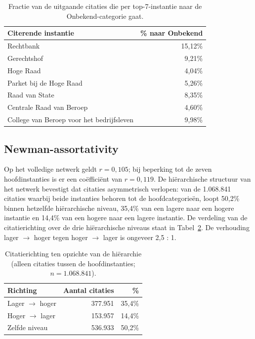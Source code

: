 \documentclass[a4paper, 12pt]{report}
\begin{document}
\begin{table}[H]
  \centering
  \caption{Fractie van de uitgaande citaties die per top-7-instantie naar de Onbekend-categorie gaat.}
  \label{tab:dv5-onbekend}
  \begin{tabular}{lr}
    \toprule
    Citerende instantie & \% naar Onbekend \\
    \midrule
    Rechtbank                                  & 15,12\% \\
    Gerechtshof                                & 9,21\% \\
    Hoge Raad                                  & 4,04\% \\
    Parket bij de Hoge Raad                    & 5,26\% \\
    Raad van State                             & 8,35\% \\
    Centrale Raad van Beroep                   & 4,60\% \\
    College van Beroep voor het bedrijfsleven  & 9,98\% \\
    \bottomrule
  \end{tabular}
\end{table}

\subsection{Newman-assortativity} 
Op het volledige netwerk geldt $r = 0{,}105$; bij beperking tot de zeven hoofdinstanties is er een coëfficiënt van $r = 0{,}119$. De hiërarchische structuur van het netwerk bevestigt dat citaties asymmetrisch verlopen: van de 1.068.841 citaties waarbij beide instanties behoren tot de hoofdcategorieën, loopt 50,2\% binnen hetzelfde hiërarchische niveau, 35,4\% van een lagere naar een hogere instantie en 14,4\% van een hogere naar een lagere instantie. De verdeling van de citatierichting over de drie hiërarchische niveaus staat in Tabel~\ref{tab:dv5-hierarchie}. De verhouding lager $\rightarrow$ hoger tegen hoger $\rightarrow$ lager is ongeveer 2,5 : 1.

\begin{table}[H]
  \centering
  \caption{Citatierichting ten opzichte van de hiërarchie (alleen citaties tussen de hoofdinstanties; $n = 1.068.841$).}
  \label{tab:dv5-hierarchie}
  \begin{tabular}{lrr}
    \toprule
    Richting & Aantal citaties & \% \\
    \midrule
    Lager $\rightarrow$ hoger & 377.951 & 35,4\% \\
    Hoger $\rightarrow$ lager & 153.957 & 14,4\% \\
    Zelfde niveau             & 536.933 & 50,2\% \\
    \bottomrule
  \end{tabular}
\end{table}
\end{document}
